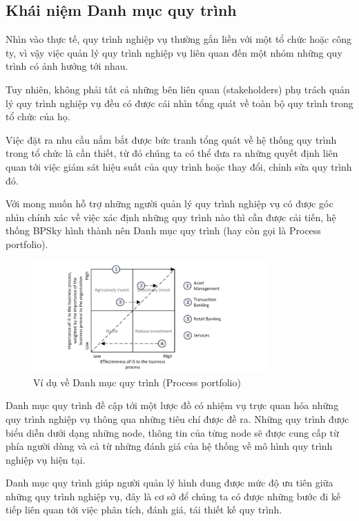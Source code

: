 \subsection{Khái niệm Danh mục quy trình}

Nhìn vào thực tế, quy trình nghiệp vụ thường gắn liền với một tổ chức hoặc công ty, vì vậy việc quản lý quy trình nghiệp vụ liên quan đến một nhóm những quy trình có ảnh hưởng tới nhau. 

Tuy nhiên, không phải tất cả những bên liên quan (stakeholders) phụ trách quản lý quy trình nghiệp vụ đều có được cái nhìn tổng quát về toàn bộ quy trình trong tổ chức của họ. 

Việc đặt ra nhu cầu nắm bắt được bức tranh tổng quát về hệ thống quy trình trong tổ chức là cần thiết, từ đó chúng ta có thể đưa ra những quyết định liên quan tới việc giám sát hiệu suất của quy trình hoặc thay đổi, chỉnh sửa quy trình đó.

Với mong muốn hỗ trợ những người quản lý quy trình nghiệp vụ có được góc nhìn chính xác về việc xác định những quy trình nào thì cần được cải tiến, hệ thống BPSky hình thành nên Danh mục quy trình (hay còn gọi là Process portfolio). 

\begin{figure}[H]
    \begin{center}
        \includegraphics[width=0.8\textwidth]{Content/Cơ sở lý thuyết/documents/Process portfolio/images/ProcessPortfolioIllustration.png}
        \vspace{0.5cm}
        \caption{Ví dụ về Danh mục quy trình (Process portfolio)}
        \label{fig: Ví dụ về Danh mục quy trình (Process portfolio)}
    \end{center}
\end{figure}

Danh mục quy trình đề cập tới một lược đồ có nhiệm vụ trực quan hóa những quy trình nghiệp vụ thông qua những tiêu chí được đề ra. Những quy trình được biểu diễn dưới dạng những node, thông tin của từng node sẽ được cung cấp từ phía người dùng và cả từ những đánh giá của hệ thống về mô hình quy trình nghiệp vụ hiện tại.

Danh mục quy trình giúp người quản lý hình dung được mức độ ưu tiên giữa những quy trình nghiệp vụ, đây là cơ sở để chúng ta có được những bước đi kế tiếp liên quan tới việc phân tích, đánh giá, tái thiết kế quy trình.